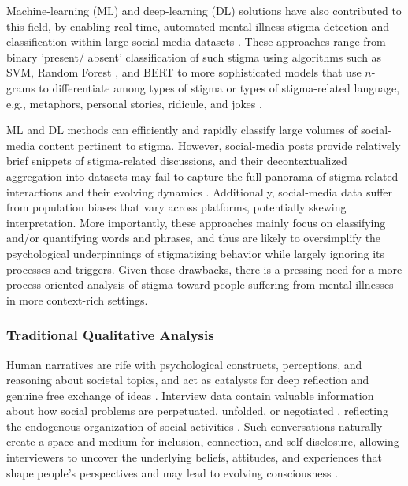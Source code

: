 Machine-learning (ML) and deep-learning (DL) solutions have also contributed to this field, by enabling real-time, automated mental-illness stigma detection and classification within large social-media datasets \cite{detect_method_robinson_2019}.
These approaches range from binary 'present/ absent' classification of such stigma using algorithms such as SVM, Random Forest \cite{detect_method_jilka_2022}, and BERT \cite{detect_method_lee_2022} to more sophisticated models that use $n$-grams to differentiate among types of stigma \cite{detect_method_li_2018} or types of stigma-related language, e.g., metaphors, personal stories, ridicule, and jokes \cite{detect_method_roesler_2024}.



ML and DL methods can efficiently and rapidly classify large volumes of social-media content pertinent to stigma. 
However, social-media posts provide relatively brief snippets of stigma-related discussions, and their decontextualized aggregation into datasets may fail to capture the full panorama of stigma-related interactions and their evolving dynamics \cite{social_media_decontext_boyd_2012}. 
Additionally, social-media data suffer from population biases \cite{social_media_deidentify_ruths_2014} that vary across platforms, potentially skewing interpretation. 
More importantly, these approaches mainly focus on classifying and/or quantifying words and phrases, and thus are likely to oversimplify the psychological underpinnings of stigmatizing behavior while largely ignoring its processes and triggers. 
Given these drawbacks, there is a pressing need for a more process-oriented analysis of stigma toward people suffering from mental illnesses in more context-rich settings.


 
\subsubsection{Traditional Qualitative Analysis}


Human narratives are rife with psychological constructs, perceptions, and reasoning about societal topics, and act as catalysts for deep reflection and genuine free exchange of ideas \cite{conversation_importance_jenlink_2005}. 
Interview data contain valuable information about how social problems are perpetuated, unfolded, or negotiated \cite{conversation_importance_jenlink_2005}, reflecting the endogenous organization of social activities \cite{conversation_banathy_2005}. 
Such conversations naturally create a space and medium for inclusion, connection, and self-disclosure, allowing interviewers to uncover the underlying beliefs, attitudes, and experiences that shape people's perspectives and may lead to evolving consciousness \cite{conversation_bohm_2004, conversation_banathy_2005}.

